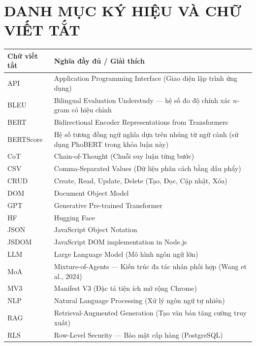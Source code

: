 \chapter*{DANH MỤC KÝ HIỆU VÀ CHỮ VIẾT TẮT}

\begin{longtable}{|>{\raggedright\arraybackslash}p{3.6cm}|>{\raggedright\arraybackslash}p{10.4cm}|}
  \hline
  \textbf{Chữ viết tắt} & \textbf{Nghĩa đầy đủ / Giải thích} \\
  \hline
  API   & Application Programming Interface (Giao diện lập trình ứng dụng) \\ \hline
  BLEU  & Bilingual Evaluation Understudy --- hệ số đo độ chính xác $n$-gram có hiệu chỉnh \\ \hline
  BERT  & Bidirectional Encoder Representations from Transformers \\ \hline
  BERTScore & Hệ số tương đồng ngữ nghĩa dựa trên nhúng từ ngữ cảnh (sử dụng PhoBERT trong khóa luận này) \\ \hline
  CoT   & Chain-of-Thought (Chuỗi suy luận từng bước) \\ \hline
  CSV   & Comma-Separated Values (Dữ liệu phân cách bằng dấu phẩy) \\ \hline
  CRUD  & Create, Read, Update, Delete (Tạo, Đọc, Cập nhật, Xóa) \\ \hline
  DOM   & Document Object Model \\ \hline
  GPT   & Generative Pre-trained Transformer \\ \hline
  HF    & Hugging Face \\ \hline
  JSON  & JavaScript Object Notation \\ \hline
  JSDOM & JavaScript DOM implementation in Node.js \\ \hline
  LLM   & Large Language Model (Mô hình ngôn ngữ lớn) \\ \hline
  MoA   & Mixture-of-Agents --- Kiến trúc đa tác nhân phối hợp (Wang et al., 2024) \\ \hline
  MV3   & Manifest V3 (Đặc tả tiện ích mở rộng Chrome) \\ \hline
  NLP   & Natural Language Processing (Xử lý ngôn ngữ tự nhiên) \\ \hline
  RAG   & Retrieval-Augmented Generation (Tạo văn bản tăng cường truy xuất) \\ \hline
  RLS   & Row-Level Security --- Bảo mật cấp hàng (PostgreSQL) \\ \hline

\end{longtable}
